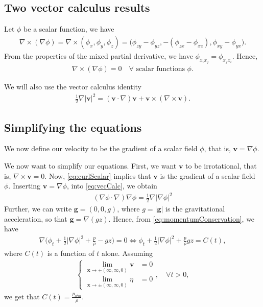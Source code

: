 \documentclass[11pt]{article}
\begin{document}
\subsection{Two vector calculus results}

Let $\phi$ be a scalar function, we have
\begin{align*}
    \nabla \times (\nabla \phi) = \nabla \times (\phi_x, \phi_y, \phi_z) =
        \big(\phi_{zy} - \phi_{yz}, -(\phi_{zx} - \phi_{xz}), \phi_{xy} - \phi_{yx} \big).
\end{align*}
From the properties of the mixed partial derivative, we have $\phi_{x_i x_j} = \phi_{x_j x_i}$. Hence,
\begin{align}
    \label{eq:curlScalar}
    \nabla \times (\nabla \phi) = 0 \quad \forall \text{ scalar functions } \phi.
\end{align}

We will also use the vector calculus identity
\begin{align}
    \label{eq:vecCalc}
    \frac{1}{2}\nabla |\bm{v}|^2 = (\bm{v}\cdot \nabla) \bm{v} + \bm{v} \times (\nabla \times \bm{v}).
\end{align}
%
%
\subsection{Simplifying the equations}
We now define our velocity to be the gradient of a scalar field $\phi$, that is, $\bm{v} = \nabla \phi$.

We now want to simplify our equations. First, we want $\bm{v}$ to be irrotational, that is,
$\nabla \times \bm{v} = 0$. Now, \eqref{eq:curlScalar} implies that $\bm{v}$ is the gradient of a scalar field
$\phi$. Inserting $\bm{v} = \nabla \phi$, into \eqref{eq:vecCalc}, we obtain
\begin{align*}
    (\nabla \phi \cdot \nabla) \nabla \phi = \frac{1}{2}\nabla |\nabla \phi|^2
\end{align*}
Further, we can write $\bm{g} = (0,0,g)$, where $g = |\bm{g}|$ is the gravitational acceleration, so that
$\bm{g} = \nabla (gz)$. Hence, from \eqref{eq:momentumConservation}, we have
\begin{align*}
    \nabla\bigg(\phi_t + \frac{1}{2}|\nabla \phi|^2 + \frac{p}{\rho} - g z \bigg) = 0
    \iff \phi_t + \frac{1}{2}|\nabla \phi|^2 + \frac{p}{\rho}  g z = C(t),
\end{align*}
where $C(t)$ is a function of $t$ alone. Assuming 
\begin{align*}
    \begin{cases}
	    \lim_{\bm{x} \rightarrow \pm(\infty,\infty, 0)}\bm{v} & = 0 \\
	    \lim_{\bm{x} \rightarrow \pm(\infty,\infty, 0)}\eta   & = 0
	\end{cases}, \quad \forall t > 0,
\end{align*}
we get that $C(t) = \frac{p_{atm}}{\rho}$.
\end{document}
